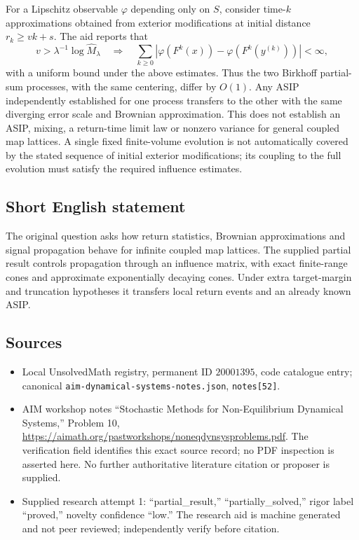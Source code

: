 \documentclass[11pt]{article}
\begin{document}
For a Lipschitz observable \(\varphi\) depending only on \(S\), consider time-\(k\) approximations obtained from exterior modifications at initial distance \(r_k\geq vk+s\). The aid reports that
\[
 v>\lambda^{-1}\log\widehat M_\lambda
 \quad\Longrightarrow\quad
 \sum_{k\geq0}|\varphi(F^k(x))-\varphi(F^k(y^{(k)}))|<\infty,
\]
with a uniform bound under the above estimates. Thus the two Birkhoff partial-sum processes, with the same centering, differ by \(O(1)\). Any ASIP independently established for one process transfers to the other with the same diverging error scale and Brownian approximation. This does not establish an ASIP, mixing, a return-time limit law or nonzero variance for general coupled map lattices. A single fixed finite-volume evolution is not automatically covered by the stated sequence of initial exterior modifications; its coupling to the full evolution must satisfy the required influence estimates.
\subsection{Short English statement}
The original question asks how return statistics, Brownian approximations and signal propagation behave for infinite coupled map lattices. The supplied partial result controls propagation through an influence matrix, with exact finite-range cones and approximate exponentially decaying cones. Under extra target-margin and truncation hypotheses it transfers local return events and an already known ASIP.
\subsection{Sources}
\begin{itemize}
\item Local UnsolvedMath registry, permanent ID \(20001395\), code catalogue entry; canonical \texttt{aim-dynamical-systems-notes.json}, \texttt{notes[52]}.
\item AIM workshop notes ``Stochastic Methods for Non-Equilibrium Dynamical Systems,'' Problem 10, \url{https://aimath.org/pastworkshops/noneqdynsysproblems.pdf}. The verification field identifies this exact source record; no PDF inspection is asserted here. No further authoritative literature citation or proposer is supplied.
\item Supplied research attempt 1: ``partial\_result,'' ``partially\_solved,'' rigor label ``proved,'' novelty confidence ``low.'' The research aid is machine generated and not peer reviewed; independently verify before citation.
\end{itemize}
\end{document}
